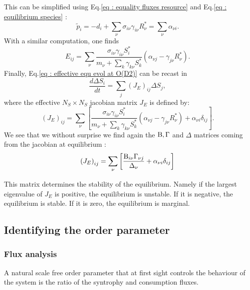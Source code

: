 \documentclass[12pt, titlepage]{report}
\begin{document}
This can be simplified using Eq.\eqref{eq : equality fluxes resource} and Eq.\eqref{eq : equilibrium species} :
\begin{equation}
\tilde{p}_i=-d_i +\sum_\nu \sigma_{i\nu}\gamma_{i\nu}R^*_\nu = \sum_\nu \alpha_{\nu i}.
\end{equation}
With a similar computation, one finds
\begin{equation}
E_{ij}=\sum_\nu \frac{\sigma_{i\nu}\gamma_{i\nu}S^*_i}{m_\nu+\sum_k \gamma_{k\nu}S^*_k} \left(\alpha_{\nu j}-\gamma_{j\nu}R^*_\nu\right).
\end{equation}
Finally, Eq.\eqref{eq : effective equ evol at O(D2)} can be recast in
\begin{equation}
\frac{d\Delta S_i}{dt} = \sum_j (J_E)_{ij} \Delta S_j,
\end{equation}
where the effective $N_S\times N_S$ jacobian matrix $J_E$ is defined by:
\begin{equation}
(J_E)_{ij}=\sum_\nu \left[\frac{\sigma_{i\nu}\gamma_{i\nu}S^*_i}{m_\nu+\sum_k \gamma_{k\nu}S^*_k} \left(\alpha_{\nu j}-\gamma_{j\nu}R^*_\nu\right)+\alpha_{\nu i}\delta_{ij}\right].
\end{equation}
We see that we without surprise we find again the $\text{B}, \Gamma $ and $\Delta$ matrices coming from the jacobian at equilibrium :
\begin{equation}
\left(J_E\right)_{ij}=\sum_\nu \left[\frac{\text{B}_{i\nu}\Gamma_{\nu j}}{\Delta_\nu}+\alpha_{\nu i} \delta_{ij}\right]
\end{equation}

This matrix determines the stability of the equilibrium. Namely if the largest eigenvalue of $J_E$ is positive, the equilibrium is unstable. If it is negative, the equilibrium is stable. If it is zero, the equilibrium is marginal.



\subsection{Identifying the order parameter}
\subsubsection{Flux analysis}
A natural scale free order parameter that at first sight controls the behaviour of the system is the ratio of the syntrophy and consumption fluxes.
\end{document}
